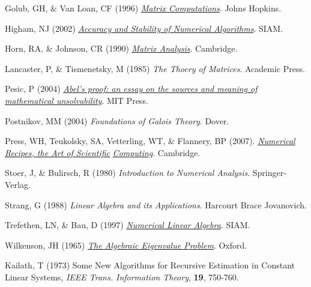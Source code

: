 \noindent Golub, GH, \& Van Loan, CF (1996) \href{http://books.google.com/books?id=mlOa7wPX6OYC&printsec=frontcover}{\it Matrix Computations}. Johns Hopkins.\vskip0.1in

\noindent Higham, NJ (2002) \href{http://books.google.com/books?id=epilvM5MMxwC&printsec=frontcover}{\it Accuracy and Stability of Numerical Algorithms}.  SIAM.\vskip0.1in

\noindent Horn, RA, \& Johnson, CR (1990) \href{http://books.google.com/books?id=9wTacOjHE6IC&printsec=frontcover}{\it Matrix Analysis}.  Cambridge.\vskip0.1in

\noindent Lancaster, P, \& Tismenetsky, M (1985) {\it The Thoery of Matrices}.  Academic Press.\vskip0.1in

\noindent Pesic, P (2004) \href{http://books.google.com/books?id=nIpGp9Y5AlEC&printsec=frontcover}{\it Abel's proof:
an essay on the sources and meaning of mathematical unsolvability}.  MIT Press.

\noindent Postnikov, MM (2004) {\it Foundations of Galois Theory}. Dover.\vskip0.1in

\noindent Press, WH, Teukolsky, SA, Vetterling, WT, \& Flannery, BP (2007). \href{http://www.nr.com/}{\it Numerical Recipes, the Art of Scientific}
\href{http://www.nr.com/}{\it Computing}. Cambridge.\vskip0.1in

\noindent Stoer, J, \& Bulirsch, R (1980) {\it Introduction to Numerical Analysis}.  Springer-Verlag.\vskip0.1in

\noindent Strang, G (1988) {\it Linear Algebra and its Applications}.  Harcourt Brace Jovanovich.\vskip0.1in

\noindent Trefethen, LN, \& Bau, D (1997) \href{http://books.google.com/books?id=bj-Lu6zjWbEC&printsec=frontcover}{\it Numerical Linear Algebra}.  SIAM.\vskip0.1in

\noindent Wilkenson, JH (1965) \href{http://books.google.com/books?id=5wsK1OP7UFgC&printsec=frontcover}{\it The Algebraic Eigenvalue Problem}.  Oxford.\vskip0.1in

\noindent Kailath, T (1973) Some New Algorithms for Recursive Estimation in Constant Linear Systems, {\it IEEE Trans. Information Theory}, {\bf 19}, 750-760.
